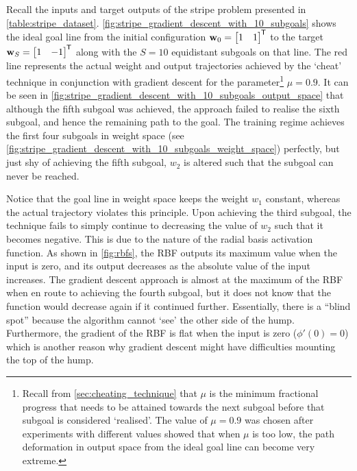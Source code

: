 Recall the inputs and target outputs of the stripe problem presented in \ref{table:stripe_dataset}.
\ref{fig:stripe_gradient_descent_with_10_subgoals} shows the ideal goal line from the initial configuration
$\mathbf{w}_0=
\begin{bmatrix}
    1 & 1
\end{bmatrix}^{\mkern-1.5mu\mathsf{T}}$
to the target
$\mathbf{w}_S=
\begin{bmatrix}
    1 & -1
\end{bmatrix}^{\mkern-1.5mu\mathsf{T}}$
along with the $S=10$ equidistant subgoals on that line.
The red line represents the actual weight and output trajectories achieved by the `cheat' technique in conjunction with gradient descent for the parameter\footnote{Recall from \ref{sec:cheating_technique} that $\mu$ is the minimum fractional progress that needs to be attained towards the next subgoal before that subgoal is considered `realised'. The value of $\mu=0.9$ was chosen after experiments with different values showed that when $\mu$ is too low, the path deformation in output space from the ideal goal line can become very extreme.} $\mu=0.9$.
It can be seen in \ref{fig:stripe_gradient_descent_with_10_subgoals_output_space} that although the fifth subgoal was achieved, the approach failed to realise the sixth subgoal, and hence the remaining path to the goal.
The training regime achieves the first four subgoals in weight space (see \ref{fig:stripe_gradient_descent_with_10_subgoals_weight_space}) perfectly, but just shy of achieving the fifth subgoal, $w_2$ is altered such that the subgoal can never be reached. 

Notice that the goal line in weight space keeps the weight $w_1$ constant, whereas the actual trajectory violates this principle. 
Upon achieving the third subgoal, the technique fails to simply continue to decreasing the value of $w_2$ such that it becomes negative. 
This is due to the nature of the radial basis activation function. 
As shown in \ref{fig:rbfs}, the RBF outputs its maximum value when the input is zero, and its output decreases as the absolute value of the input increases. 
The gradient descent approach is almost at the maximum of the RBF when en route to achieving the fourth subgoal, but it does not know that the function would decrease again if it continued further.
Essentially, there is a ``blind spot'' \cite{karayiannis1998} because the algorithm cannot `see' the other side of the hump.
Furthermore, the gradient of the RBF is flat when the input is zero ($\phi'(0)=0$) which is another reason why gradient descent might have difficulties mounting the top of the hump.

